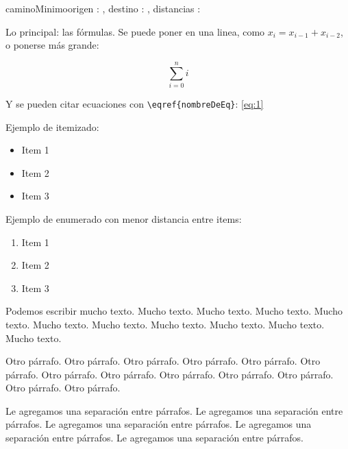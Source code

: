 \documentclass[10pt,a4paper]{article}
\begin{document}
\begin{proc}{caminoMinimo}{\In origen : \ent, \In destino : \ent, \In distancias : \TLista{\TLista{\ent}}}{\TLista{\ent}}
\end{proc}



Lo principal: las fórmulas. Se puede poner en una linea, como $x_i = x_{i-1} + x_{i-2}$, o ponerse más grande:

\begin{equation}
	\sum\limits_{i=0}^{n} i
	\label{eq:1}
\end{equation}

Y se pueden citar ecuaciones con \verb|\eqref{nombreDeEq}|: \eqref{eq:1}

Ejemplo de itemizado:

\begin{itemize}
	\item Item 1
	\item Item 2
	\item Item 3
\end{itemize}

Ejemplo de enumerado con menor distancia entre items:

\begin{enumerate} \setlength\itemsep{0cm}
	\item Item 1
	\item Item 2
	\item Item 3
\end{enumerate}

Podemos escribir mucho texto. Mucho texto. Mucho texto. Mucho texto. Mucho texto. Mucho texto. Mucho texto. Mucho texto. Mucho texto. Mucho texto. Mucho texto.

Otro párrafo. Otro párrafo. Otro párrafo. Otro párrafo. Otro párrafo. Otro párrafo. Otro párrafo. Otro párrafo. Otro párrafo. Otro párrafo. Otro párrafo. Otro párrafo. Otro párrafo.

\vspace{0.3cm}

Le agregamos una separación entre párrafos. Le agregamos una separación entre párrafos. Le agregamos una separación entre párrafos. Le agregamos una separación entre párrafos. Le agregamos una separación entre párrafos.
\end{document}
